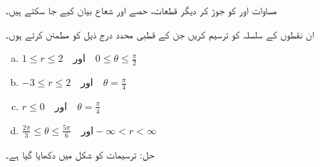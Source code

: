 مساوات  اور  کو جوڑ کر دیگر قطعات، حصے اور شعاع بیان کیے جا سکتے ہیں۔

ان نقطوں کے سلسلہ کو ترسیم کریں جن کے قطبی محدد درج ذیل کو مطمئن کرتے ہوں۔ 
\begin{enumerate}[a.]
\item
$1\le r\le 2\quad \text{اور}\quad  0\le \theta\le \frac{\pi}{2}$
\item
$-3\le r\le 2\quad \text{اور}\quad  \theta=\frac{\pi}{4}$
\item
$r\le  0\quad \text{اور}\quad  \theta=\frac{\pi}{4}$
\item
$\frac{2\pi}{3}\le \theta\le \frac{5\pi}{6}\quad \text{اور} -\infty<r<\infty$
\end{enumerate}

حل:\quad
ترسیمات کو شکل  میں دکھایا گیا ہے۔
